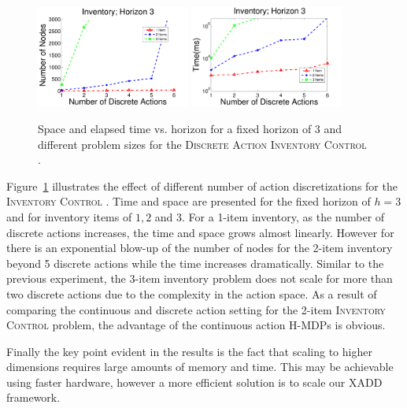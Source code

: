 \documentclass[twoside,11pt]{article}
\newcommand{\InventoryControl}{\textsc{Inventory Control }}
\begin{document}
\begin{figure}[tbp!]
\vspace{-2mm}
\centering
\includegraphics[width=0.45\textwidth]{pics/invH3Node.pdf}
\hspace{2mm}
\includegraphics[width=0.45\textwidth]{pics/invH3Time.pdf}
\vspace{-2mm}
\caption{%
Space and elapsed time vs. horizon for a fixed horizon of 3 and different problem sizes for the \textsc{Discrete Action} \InventoryControl. 
}
\label{fig:invH3}
\vspace{-2mm}
\end{figure}

Figure~\ref{fig:invH3} illustrates the effect of different number of action discretizations for the \InventoryControl. Time and space are presented for the fixed horizon of $h=3$ and for inventory items of $1,2$ and $3$. For a 1-item inventory, as the number of discrete actions increases, the time and space grows almost linearly. However for there is an exponential blow-up of the number of nodes for the 2-item inventory beyond 5 discrete actions while the time increases dramatically. Similar to the previous experiment, the 3-item inventory problem does not scale for more than two discrete actions due to the complexity in the action space. As a result of comparing the continuous and discrete action setting for the 2-item \InventoryControl problem, the advantage of the continuous action H-MDPs is obvious. 

Finally the key point evident in the results is the fact that scaling to higher dimensions requires large amounts of memory and time. This may be achievable using faster hardware, however a more efficient solution is to scale our XADD framework.
\end{document}
